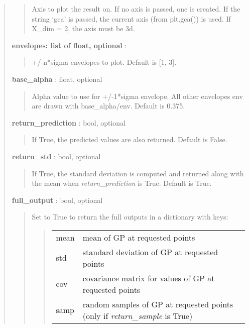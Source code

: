 \documentclass[letterpaper,10pt,english]{sphinxmanual}
\begin{document}
\begin{fulllineitems}
\begin{fulllineitems}
\begin{quote}
\begin{description}
\begin{quote}
Axis to plot the result on. If no axis is passed, one is created.
If the string `gca' is passed, the current axis (from plt.gca())
is used. If X\_dim = 2, the axis must be 3d.
\end{quote}

\textbf{envelopes: list of float, optional} :
\begin{quote}

+/-n*sigma envelopes to plot. Default is {[}1, 3{]}.
\end{quote}

\textbf{base\_alpha} : float, optional
\begin{quote}

Alpha value to use for +/-1*sigma envelope. All other envelopes env
are drawn with base\_alpha/env. Default is 0.375.
\end{quote}

\textbf{return\_prediction} : bool, optional
\begin{quote}

If True, the predicted values are also returned. Default is False.
\end{quote}

\textbf{return\_std} : bool, optional
\begin{quote}

If True, the standard deviation is computed and returned along with
the mean when \emph{return\_prediction} is True. Default is True.
\end{quote}

\textbf{full\_output} : bool, optional
\begin{quote}

Set to True to return the full outputs in a dictionary with keys:
\begin{quote}

\begin{tabulary}{\linewidth}{|L|L|}
\hline

mean
 & 
mean of GP at requested points
\\

std
 & 
standard deviation of GP at requested points
\\

cov
 & 
covariance matrix for values of GP at requested points
\\

samp
 & 
random samples of GP at requested points (only if \emph{return\_sample} is True)
\\
\hline\end{tabulary}


\end{quote}
\end{quote}
\end{description}
\end{quote}
\end{fulllineitems}
\end{fulllineitems}
\end{document}
